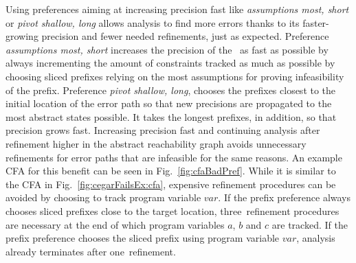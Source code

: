 Using preferences aiming at increasing precision fast like \emph{assumptions most, short} or \emph{pivot shallow, long} allows analysis to find more errors thanks to its faster-growing precision and fewer needed refinements, just as expected.
Preference \emph{assumptions most, short} increases the precision of the \constraintsCPA\ as fast as possible by always incrementing the amount of constraints tracked as much as possible by choosing sliced prefixes relying on the most assumptions for proving infeasibility of the prefix.
Preference \emph{pivot shallow, long}, chooses the prefixes closest to the initial location of the error path so that new precisions are propagated to the most abstract states possible. It takes the longest prefixes, in addition, so that precision grows fast.
Increasing precision fast and continuing analysis after refinement higher in the abstract reachability graph avoids unnecessary refinements for error paths that are infeasible for the same reasons.
An example CFA for this benefit can be seen in Fig.~\ref{fig:cfaBadPref}.
While it is similar to the CFA in Fig.~\ref{fig:cegarFailsEx:cfa}, expensive refinement procedures can be avoided by choosing to track program variable $var$.
If the prefix preference always chooses sliced prefixes close to the target location, three~refinement procedures are necessary at the end of which program variables $a$, $b$ and $c$ are tracked.
If the prefix preference chooses the sliced prefix using program variable $var$, analysis already terminates after one~refinement.

